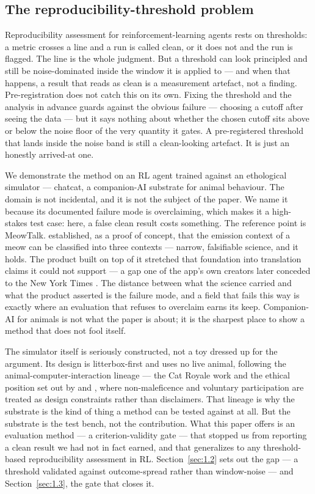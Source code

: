 \documentclass{article}
\begin{document}
\subsection{The reproducibility-threshold problem}
\label{sec:1.1}

Reproducibility assessment for reinforcement-learning agents rests on thresholds: a metric crosses a line and a run is called clean, or it does not and the run is flagged. The line is the whole judgment. But a threshold can look principled and still be noise-dominated inside the window it is applied to --- and when that happens, a result that reads as clean is a measurement artefact, not a finding. Pre-registration does not catch this on its own. Fixing the threshold and the analysis in advance guards against the obvious failure --- choosing a cutoff after seeing the data --- but it says nothing about whether the chosen cutoff sits above or below the noise floor of the very quantity it gates. A pre-registered threshold that lands inside the noise band is still a clean-looking artefact. It is just an honestly arrived-at one.

We demonstrate the method on an RL agent trained against an ethological simulator --- chatcat, a companion-AI substrate for animal behaviour. The domain is not incidental, and it is not the subject of the paper. We name it because its documented failure mode is overclaiming, which makes it a high-stakes test case: here, a false clean result costs something. The reference point is MeowTalk. \citet{ntalampiras2019} established, as a proof of concept, that the emission context of a meow can be classified into three contexts --- narrow, falsifiable science, and it holds. The product built on top of it stretched that foundation into translation claims it could not support --- a gap one of the app's own creators later conceded to the New York Times \citep{anthes2022}. The distance between what the science carried and what the product asserted is the failure mode, and a field that fails this way is exactly where an evaluation that refuses to overclaim earns its keep. Companion-AI for animals is not what the paper is about; it is the sharpest place to show a method that does not fool itself.

The simulator itself is seriously constructed, not a toy dressed up for the argument. Its design is litterbox-first and uses no live animal, following the animal-computer-interaction lineage --- the Cat Royale work \citep{schneiders2024} and the ethical position set out by \citet{vanpatter2020} and \citet{mancini2023}, where non-maleficence and voluntary participation are treated as design constraints rather than disclaimers. That lineage is why the substrate is the kind of thing a method can be tested against at all. But the substrate is the test bench, not the contribution. What this paper offers is an evaluation method --- a criterion-validity gate --- that stopped us from reporting a clean result we had not in fact earned, and that generalizes to any threshold-based reproducibility assessment in RL. Section~\ref{sec:1.2} sets out the gap --- a threshold validated against outcome-spread rather than window-noise --- and Section~\ref{sec:1.3}, the gate that closes it.
\end{document}
